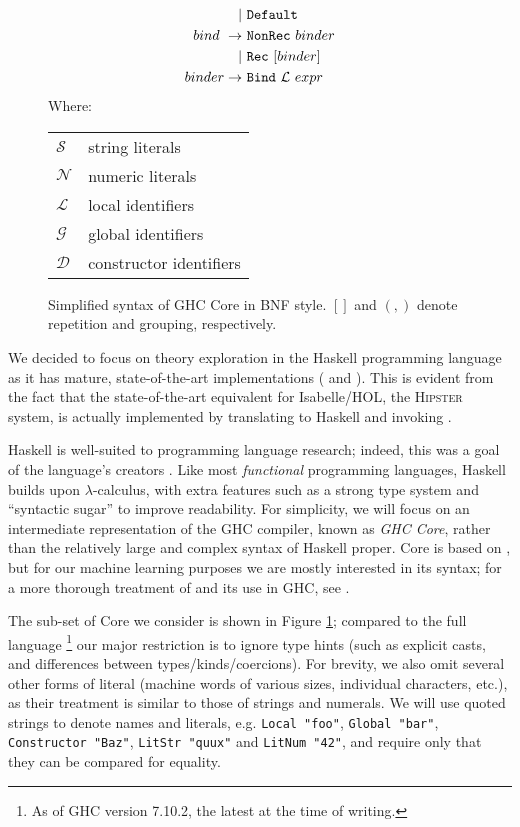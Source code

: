 \begin{figure}
\begin{equation*}
\begin{split}
                         |\ & \texttt{Default}                          \\
      bind\    \rightarrow\ & \texttt{NonRec}\ binder                   \\
                         |\ & \texttt{Rec}\ [binder]                    \\
      binder   \rightarrow\ & \texttt{Bind}\ \mathcal{L}\ expr
    \end{split}
  \end{equation*}
  Where:
  \begin{tabular}[t]{l @{ $=$ } l}
    $\mathcal{S}$ & string literals    \\
    $\mathcal{N}$ & numeric literals   \\
    $\mathcal{L}$ & local identifiers  \\
    $\mathcal{G}$ & global identifiers \\
    $\mathcal{D}$ & constructor identifiers
  \end{tabular}

  \caption{Simplified syntax of GHC Core in BNF style. $[]$ and $(,)$ denote repetition and grouping, respectively.}
  \label{fig:coresyntax}
\end{figure}

We decided to focus on theory exploration in the Haskell programming language as
it has mature, state-of-the-art implementations (\qspec{} \cite{QuickSpec} and
\hspec{} \cite{claessen2013automating}). This is evident from the fact that the
state-of-the-art equivalent for Isabelle/HOL, the \textsc{Hipster}
\cite{Hipster} system, is actually implemented by translating to Haskell and
invoking \hspec{}.

Haskell is well-suited to programming language research; indeed, this was a goal
of the language's creators \cite{marlow2010haskell}. Like most
\emph{functional} programming languages, Haskell builds upon $\lambda$-calculus,
with extra features such as a strong type system and ``syntactic sugar'' to
improve readability. For simplicity, we will focus on an intermediate
representation of the \textsc{GHC} compiler, known as \emph{GHC Core}, rather
than the relatively large and complex syntax of Haskell proper. Core is based on
\fc{}, but for our machine learning purposes we are mostly interested in its
syntax; for a more thorough treatment of \fc{} and its use in GHC, see
\cite[Appendix C]{sulzmann2007system}.

The sub-set of Core we consider is shown in Figure \ref{fig:coresyntax};
compared to the full language \footnote{As of GHC version 7.10.2, the latest at
  the time of writing.} our major restriction is to ignore type hints (such as
explicit casts, and differences between types/kinds/coercions). For brevity, we
also omit several other forms of literal (machine words of various sizes,
individual characters, etc.), as their treatment is similar to those of strings
and numerals. We will use quoted strings to denote names and literals,
e.g. \texttt{Local "foo"}, \texttt{Global "bar"}, \texttt{Constructor "Baz"},
\texttt{LitStr "quux"} and \texttt{LitNum "42"}, and require only that they can
be compared for equality.

